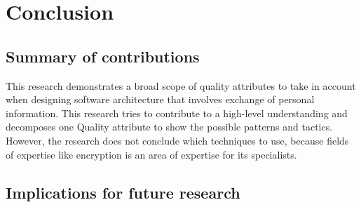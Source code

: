 \chapter{Conclusion}\label{s:conclusion}
\section{Summary of contributions}
This research demonstrates a broad scope of quality attributes to take in account when designing software architecture that involves exchange of personal information. This research tries to contribute to a high-level understanding and decomposes one Quality attribute to show the possible patterns and tactics. However, the research does not conclude which techniques to use, because fields of expertise like encryption is an area of expertise for its specialists.

\section{Implications for future research}

